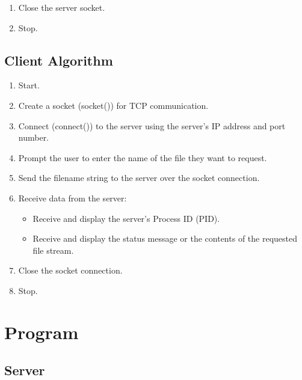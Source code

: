 \documentclass[12pt, a4paper]{report}
\begin{document}
\begin{enumerate}
\begin{enumerate}
\begin{itemize}
\begin{enumerate}
			\end{enumerate}
			\item If fork() $> 0$ (Parent Process):
			\begin{enumerate}
				\item Close the connected socket descriptor in the parent.
				\item Loop back to accept the next client connection (concurrent handling).
			\end{enumerate}
		\end{itemize}
	\end{enumerate}
	\item Close the server socket.
	\item Stop.
\end{enumerate}

\subsection*{Client Algorithm}
\begin{enumerate}
	\item Start.
	\item Create a socket (socket()) for TCP communication.
	\item Connect (connect()) to the server using the server's IP address and port number.
	\item Prompt the user to enter the name of the file they want to request.
	\item Send the filename string to the server over the socket connection.
	\item Receive data from the server:
	\begin{itemize}
		\item Receive and display the server's Process ID (PID).
		\item Receive and display the status message or the contents of the requested file stream.
	\end{itemize}
	\item Close the socket connection.
	\item Stop.
\end{enumerate}

\section*{Program}

\subsection*{Server}

\end{document}
